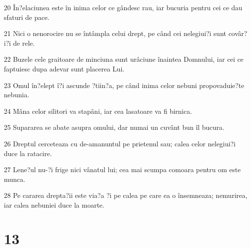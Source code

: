 \par 20 În?elaciunea este în inima celor ce gândesc rau, iar bucuria pentru cei ce dau sfaturi de pace.
\par 21 Nici o nenorocire nu se întâmpla celui drept, pe când cei nelegiui?i sunt covâr?i?i de rele.
\par 22 Buzele cele graitoare de minciuna sunt urâciune înaintea Domnului, iar cei ce faptuiesc dupa adevar sunt placerea Lui.
\par 23 Omul în?elept î?i ascunde ?tiin?a, pe când inima celor nebuni propovaduie?te nebunia.
\par 24 Mâna celor silitori va stapâni, iar cea lasatoare va fi birnica.
\par 25 Supararea se abate asupra omului, dar numai un cuvânt bun îl bucura.
\par 26 Dreptul cerceteaza cu de-amanuntul pe prietenul sau; calea celor nelegiui?i duce la ratacire.
\par 27 Lene?ul nu-?i frige nici vânatul lui; cea mai scumpa comoara pentru om este munca.
\par 28 Pe cararea drepta?ii este via?a ?i pe calea pe care ea o însemneaza; nemurirea, iar calea nebuniei duce la moarte.

\chapter{13}

